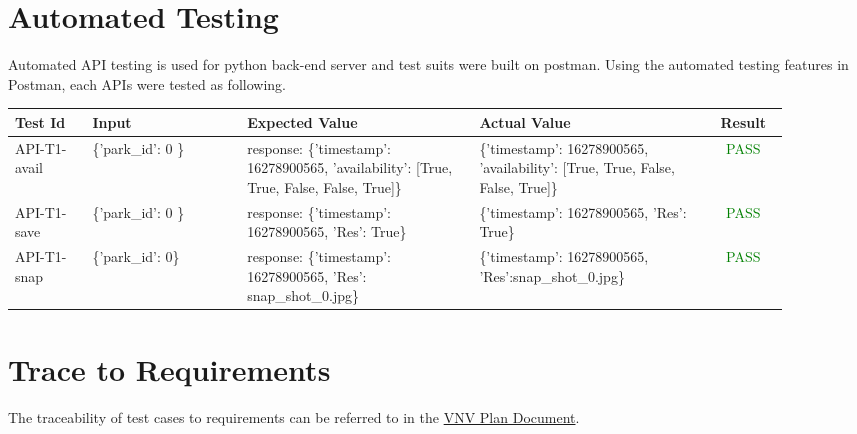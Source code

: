 \documentclass[12pt, titlepage]{article}
\begin{document}
\color{black}

\section{Automated Testing}

Automated API testing is used for python back-end server and test suits were
built on postman. Using the automated testing features in Postman, each APIs
were tested as following.

\begin{center}
\begin{tabular}{|p{0.10\linewidth}|p{0.20\linewidth}|p{0.30\linewidth}|p{0.30\linewidth}|c|} 
\hline
\textbf{Test Id} & \textbf{Input} & \textbf{Expected Value} & \textbf{Actual
Value} & \textbf{Result} \\
\hline 
API-T1-avail &  \{'park\_id': 0 \} & response: \{'timestamp': 16278900565,
'availability': [True, True, False, False, True]\} & \{'timestamp': 16278900565,
'availability': [True, True, False, False, True]\} & \textcolor{Green}{PASS} \\
\hline 
API-T1-save & \{'park\_id': 0 \}  & response: \{'timestamp': 16278900565, 'Res':
True\} &\{'timestamp': 16278900565, 'Res': True\} & \textcolor{Green}{PASS} \\
\hline
API-T1-snap &  \{'park\_id': 0\} & response: \{'timestamp': 16278900565, 'Res':
snap\_shot\_0.jpg\} &\{'timestamp': 16278900565, 'Res':snap\_shot\_0.jpg\} &
\textcolor{Green}{PASS} \\
\hline 
\end{tabular}
\end{center}


		
\section{Trace to Requirements}
The traceability of test cases to requirements can be referred to in the
\href{https://github.com/parkd-app/park-d/blob/main/docs/VnVPlan/VnVPlan.pdf}{VNV
Plan Document}.
\end{document}
